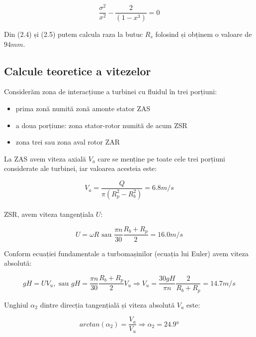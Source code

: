 \begin{equation}
\frac{\sigma^2}{x^2} - \frac{2}{(1-x^3)} = 0
\end{equation}

Din (2.4) și (2.5) putem calcula raza la butuc $R_{s}$ folosind \cite{lebedev1991formulae} și obținem o valoare de $94\si{mm}$.

\clearpage


\subsection{Calcule teoretice a vitezelor}

Considerăm zona de interacțiune a turbinei cu fluidul în trei porțiuni:
\begin{itemize}
	\item prima zonă numită zonă amonte stator ZAS
	\item a doua porțiune: zona stator-rotor numită de acum ZSR
	\item zona trei sau zona aval rotor ZAR
\end{itemize}

La ZAS avem viteza axială $V_{a}$ care se menține pe toate cele trei porțiuni considerate ale turbinei, iar valoarea acesteia este:

\begin{equation}
V_a=\frac{Q}{\pi(R_{p}^2-R_{b}^2)}=6.8\si{m/s}
\end{equation}\\

 ZSR, avem viteza tangențiala $U$:

\begin{equation}
U=\omega R \text{ sau } \frac{\pi n}{30} \frac{R_{b} + R_{p}}{2}=16.0\si{m/s}
\end{equation}

Conform ecuației fundamentale a turbomașinilor (ecuația lui Euler) avem viteza absolută:

\begin{equation}
gH=UV_{u}, \text{ sau } gH=\frac{\pi n}{30} \frac{R_{b}+R_{p}}{2} V_{u} \Rightarrow V_{u} = \frac{30gH}{\pi n} \frac{2}{R_{b}+R_{p}} = 14.7\si{m/s}
\end{equation}


Unghiul $\alpha_2$ dintre direcția tangențială și viteza absolută $V_u$ este:

\begin{equation}
arctan(\alpha_{2 })=\frac{V_{a}}{V_{u}} \Rightarrow \alpha_{2}=24.9\si{\degree}
\end{equation}



